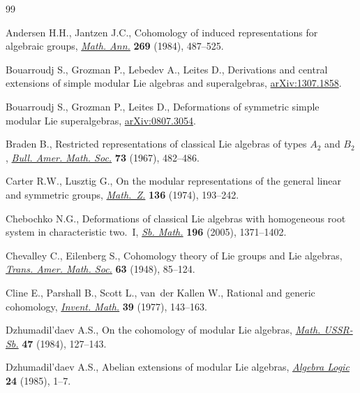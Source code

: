 \documentclass[pdftex]{sigma}%
\numberwithin{equation}{section}
\begin{document}
\begin{thebibliography}{99}
\footnotesize\itemsep=0pt

Andersen H.H., Jantzen J.C., Cohomology of induced representations for
 algebraic groups, \href{https://doi.org/10.1007/BF01450762}{\textit{Math. Ann.}} \textbf{269} (1984), 487--525.

Bouarroudj S., Grozman P., Lebedev A., Leites D., Derivations and central
 extensions of simple modular {L}ie algebras and superalgebras,
 \href{https://arxiv.org/abs/1307.1858}{arXiv:1307.1858}.

Bouarroudj S., Grozman P., Leites D., Deformations of symmetric simple modular
 {L}ie superalgebras, \href{https://arxiv.org/abs/0807.3054}{arXiv:0807.3054}.

Braden B., Restricted representations of classical {L}ie algebras of types
 {$A_{2}$} and {$B_{2}$}, \href{https://doi.org/10.1090/S0002-9904-1967-11788-9}{\textit{Bull. Amer. Math. Soc.}} \textbf{73} (1967),
 482--486.

Carter R.W., Lusztig G., On the modular representations of the general linear
 and symmetric groups, \href{https://doi.org/10.1007/BF01214125}{\textit{Math.~Z.}} \textbf{136} (1974), 193--242.

Chebochko N.G., Deformations of classical {L}ie algebras with homogeneous root
 system in characteristic two.~{I}, \href{https://doi.org/10.1070/SM2005v196n09ABEH003647}{\textit{Sb. Math.}} \textbf{196} (2005),
 1371--1402.

Chevalley C., Eilenberg S., Cohomology theory of {L}ie groups and {L}ie
 algebras, \href{https://doi.org/10.2307/1990637}{\textit{Trans. Amer. Math. Soc.}} \textbf{63} (1948), 85--124.

Cline E., Parshall B., Scott L., van~der Kallen W., Rational and generic
 cohomology, \href{https://doi.org/10.1007/BF01390106}{\textit{Invent. Math.}} \textbf{39} (1977), 143--163.

Dzhumadil'daev A.S., On the cohomology of modular Lie algebras, \href{https://doi.org/10.1070/SM1984v047n01ABEH002634}{\textit{Math.
 USSR-Sb.}} \textbf{47} (1984), 127--143.

Dzhumadil'daev A.S., Abelian extensions of modular {L}ie algebras,
 \href{https://doi.org/10.1007/BF01978701}{\textit{Algebra Logic}} \textbf{24} (1985), 1--7.


\end{thebibliography}
\end{document}
